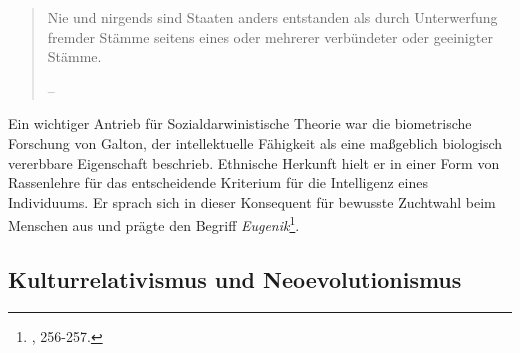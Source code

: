 \documentclass[openany,twoside,twocolumn]{book}
\let\rmarkdownfootnote\footnote%
\def\footnote{\protect\rmarkdownfootnote}
\begin{document}
\begin{quote}
Nie und nirgends sind Staaten anders entstanden als durch Unterwerfung
fremder Stämme seitens eines oder mehrerer verbündeter oder geeinigter
Stämme.

-- \autocite{GumplowiczGrundrissSoziologie1885}
\end{quote}

Ein wichtiger Antrieb für Sozialdarwinistische Theorie war die
biometrische Forschung von Galton, der intellektuelle Fähigkeit als eine
maßgeblich biologisch vererbbare Eigenschaft beschrieb. Ethnische
Herkunft hielt er in einer Form von Rassenlehre für das entscheidende
Kriterium für die Intelligenz eines Individuums. Er sprach sich in
dieser Konsequent für bewusste Zuchtwahl beim Menschen aus und prägte
den Begriff \emph{Eugenik}\footnote{\textcite{bowler_evolution_1989},
  256-257.}.

\hypertarget{cultural-relativism-neoevolutionism}{%
\subsection{Kulturrelativismus und
Neoevolutionismus}\label{cultural-relativism-neoevolutionism}}
\end{document}
